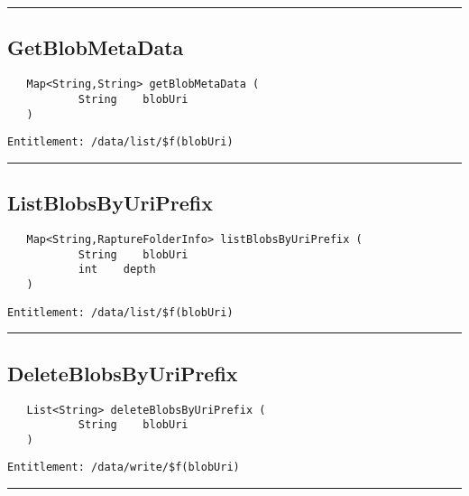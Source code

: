 \rule{12cm}{2pt}
\subsection{GetBlobMetaData}
\label{Api:GetBlobMetaData}
\begin{Verbatim}
   Map<String,String> getBlobMetaData (
           String    blobUri
   )
\end{Verbatim}
\begin{Verbatim}[formatcom=\color{Maroon}]
  Entitlement: /data/list/$f(blobUri)
\end{Verbatim}



\rule{12cm}{2pt}
\subsection{ListBlobsByUriPrefix}
\label{Api:ListBlobsByUriPrefix}
\begin{Verbatim}
   Map<String,RaptureFolderInfo> listBlobsByUriPrefix (
           String    blobUri
           int    depth
   )
\end{Verbatim}
\begin{Verbatim}[formatcom=\color{Maroon}]
  Entitlement: /data/list/$f(blobUri)
\end{Verbatim}



\rule{12cm}{2pt}
\subsection{DeleteBlobsByUriPrefix}
\label{Api:DeleteBlobsByUriPrefix}
\begin{Verbatim}
   List<String> deleteBlobsByUriPrefix (
           String    blobUri
   )
\end{Verbatim}
\begin{Verbatim}[formatcom=\color{Maroon}]
  Entitlement: /data/write/$f(blobUri)
\end{Verbatim}



\rule{12cm}{2pt}
